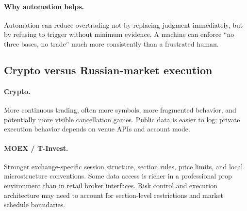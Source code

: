 \paragraph{Why automation helps.} Automation can reduce overtrading not by replacing judgment immediately, but by refusing to trigger without minimum evidence. A machine can enforce ``no three bases, no trade'' much more consistently than a frustrated human.

\subsection{Crypto versus Russian-market execution}

\paragraph{Crypto.} More continuous trading, often more symbols, more fragmented behavior, and potentially more visible cancellation games. Public data is easier to log; private execution behavior depends on venue APIs and account mode.

\paragraph{MOEX / T-Invest.} Stronger exchange-specific session structure, section rules, price limits, and local microstructure conventions. Some data access is richer in a professional prop environment than in retail broker interfaces. Risk control and execution architecture may need to account for section-level restrictions and market schedule boundaries.

